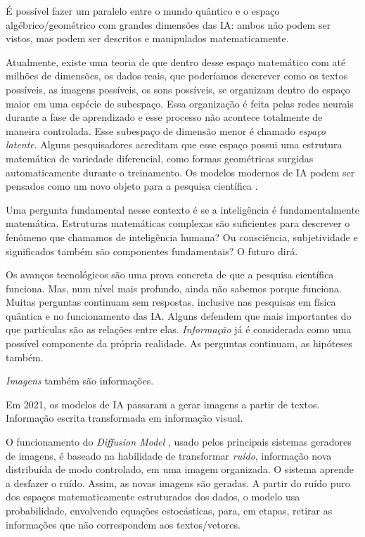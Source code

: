 \documentclass{hipatia}
\begin{document}
É possível fazer um paralelo entre o mundo quântico e o espaço algébrico/geométrico com grandes dimensões das IA: ambos não podem ser vistos, mas podem ser descritos e manipulados matematicamente.

Atualmente, existe uma teoria de que dentro desse espaço matemático com até milhões de dimensões, os dados reais, que poderíamos descrever como os textos possíveis, as imagens possíveis, os sons possíveis, se organizam dentro do espaço maior em uma espécie de subespaço. Essa organização é feita pelas redes neurais durante a fase de aprendizado e esse processo não acontece totalmente de maneira controlada. Esse subespaço de dimensão menor é chamado \textit{espaço latente}. Alguns pesquisadores acreditam que esse espaço possui uma estrutura matemática de variedade diferencial, como formas geométricas surgidas automaticamente durante o treinamento. Os modelos modernos de IA podem ser pensados como um novo objeto para a pesquisa científica \cite{Arvanitidis2021}.

Uma pergunta fundamental nesse contexto é se a inteligência é fundamentalmente matemática. Estruturas matemáticas complexas são suficientes para descrever o fenômeno que chamamos de inteligência humana? Ou consciência, subjetividade e significados também são componentes fundamentais? O futuro dirá.

Os avanços tecnológicos são uma prova concreta de que a pesquisa científica funciona. Mas, num nível mais profundo, ainda não sabemos porque funciona. Muitas perguntas continuam sem respostas, inclusive nas pesquisas em física quântica e no funcionamento das IA.  Alguns defendem que mais importantes do que partículas são as relações entre elas. \textit{Informação} já é considerada como uma possível componente da própria realidade. As perguntas continuam, as hipóteses também.

\textit{Imagens} também são informações.

Em 2021, os modelos de IA passaram a gerar imagens a partir de textos. Informação escrita transformada em informação visual.

O funcionamento do \textit{Diffusion Model} 	\cite{Ho2020}, usado pelos principais sistemas geradores de imagens, é baseado na habilidade de transformar \textit{ruído}, informação nova distribuída de modo controlado, em uma imagem organizada. O sistema aprende a desfazer o ruído. Assim, as novas imagens são geradas. A partir do ruído puro dos espaços matematicamente estruturados dos dados, o modelo usa probabilidade, envolvendo equações estocásticas, para, em etapas, retirar as informações que não correspondem aos textos/vetores.
\end{document}
